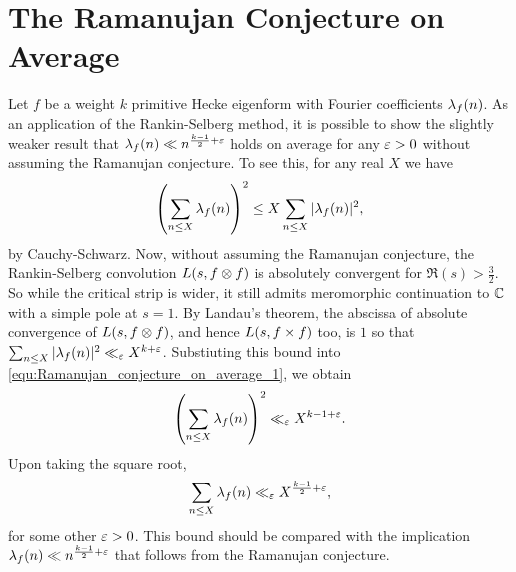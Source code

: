     \section{The Ramanujan Conjecture on Average}
      Let $f$ be a weight $k$ primitive Hecke eigenform with Fourier coefficients $\lambda_{f}(n)$. As an application of the Rankin-Selberg method, it is possible to show the slightly weaker result that $\lambda_{f}(n) \ll n^{\frac{k-1}{2}+\varepsilon}$ holds on average for any $\varepsilon > 0$ without assuming the Ramanujan conjecture. To see this, for any real $X$ we have
      \begin{equation}\label{equ:Ramanujan_conjecture_on_average_1}
        \left(\sum_{n \le X}\lambda_{f}(n)\right)^{2} \le X\sum_{n \le X}|\lambda_{f}(n)|^{2},
      \end{equation}
      by Cauchy-Schwarz. Now, without assuming the Ramanujan conjecture, the Rankin-Selberg convolution $L(s,f \otimes f)$ is absolutely convergent for $\Re(s) > \frac{3}{2}$. So while the critical strip is wider, it still admits meromorphic continuation to $\mathbb{C}$ with a simple pole at $s = 1$. By Landau's theorem, the abscissa of absolute convergence of $L(s,f \otimes f)$, and hence $L(s,f \times f)$ too, is $1$ so that $\sum_{n \le X}|\lambda_{f}(n)|^{2} \ll_{\varepsilon} X^{k+\varepsilon}$. Substiuting this bound into \cref{equ:Ramanujan_conjecture_on_average_1}, we obtain
      \[
        \left(\sum_{n \le X}\lambda_{f}(n)\right)^{2} \ll_{\varepsilon} X^{k-1+\varepsilon}.
      \]
      Upon taking the square root,
      \[
        \sum_{n \le X}\lambda_{f}(n) \ll_{\varepsilon} X^{\frac{k-1}{2}+\varepsilon},
      \]
      for some other $\varepsilon > 0$. This bound should be compared with the implication $\lambda_{f}(n) \ll n^{\frac{k-1}{2}+\varepsilon}$ that follows from the Ramanujan conjecture.